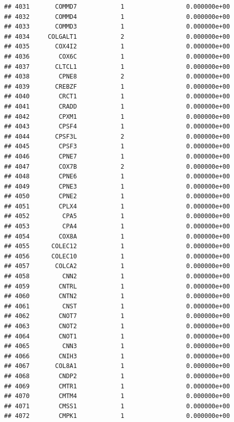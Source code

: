 \documentclass[
]{article}
\begin{document}
\begin{verbatim}
## 4031       COMMD7            1                 0.000000e+00
## 4032       COMMD4            1                 0.000000e+00
## 4033       COMMD3            1                 0.000000e+00
## 4034     COLGALT1            2                 0.000000e+00
## 4035       COX4I2            1                 0.000000e+00
## 4036        COX6C            1                 0.000000e+00
## 4037       CLTCL1            1                 0.000000e+00
## 4038        CPNE8            2                 0.000000e+00
## 4039       CREBZF            1                 0.000000e+00
## 4040        CRCT1            1                 0.000000e+00
## 4041        CRADD            1                 0.000000e+00
## 4042        CPXM1            1                 0.000000e+00
## 4043        CPSF4            1                 0.000000e+00
## 4044       CPSF3L            2                 0.000000e+00
## 4045        CPSF3            1                 0.000000e+00
## 4046        CPNE7            1                 0.000000e+00
## 4047        COX7B            2                 0.000000e+00
## 4048        CPNE6            1                 0.000000e+00
## 4049        CPNE3            1                 0.000000e+00
## 4050        CPNE2            1                 0.000000e+00
## 4051        CPLX4            1                 0.000000e+00
## 4052         CPA5            1                 0.000000e+00
## 4053         CPA4            1                 0.000000e+00
## 4054        COX8A            1                 0.000000e+00
## 4055      COLEC12            1                 0.000000e+00
## 4056      COLEC10            1                 0.000000e+00
## 4057       COLCA2            1                 0.000000e+00
## 4058         CNN2            1                 0.000000e+00
## 4059        CNTRL            1                 0.000000e+00
## 4060        CNTN2            1                 0.000000e+00
## 4061         CNST            1                 0.000000e+00
## 4062        CNOT7            1                 0.000000e+00
## 4063        CNOT2            1                 0.000000e+00
## 4064        CNOT1            1                 0.000000e+00
## 4065         CNN3            1                 0.000000e+00
## 4066        CNIH3            1                 0.000000e+00
## 4067       COL8A1            1                 0.000000e+00
## 4068        CNDP2            1                 0.000000e+00
## 4069        CMTR1            1                 0.000000e+00
## 4070        CMTM4            1                 0.000000e+00
## 4071        CMSS1            1                 0.000000e+00
## 4072        CMPK1            1                 0.000000e+00

\end{verbatim}
\end{document}
